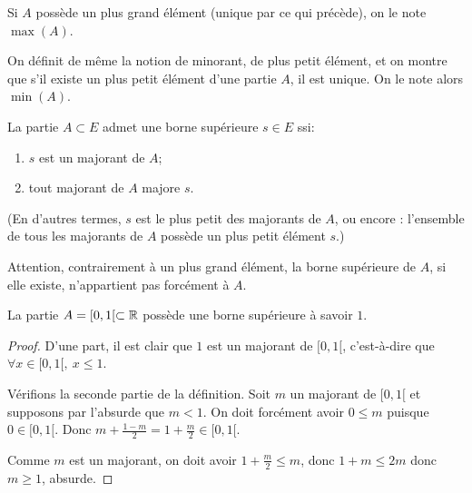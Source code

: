 Si $A$ possède un plus grand élément (unique par ce qui précède), on le note $\max(A)$.


On définit de même  la notion de minorant, de plus petit élément, et on montre que s'il existe un plus petit élément d'une partie $A$, il est unique. On le note alors $\min(A)$.

\begin{definition} La partie $A\subset E$ admet une borne supérieure $s\in E$ ssi:
\begin{enumerate}
\item $s$ est un majorant de $A$;
\item tout majorant de $A$ majore $s$.
\end{enumerate}
(En d'autres termes, $s$ est le plus petit des majorants de $A$, ou encore : l'ensemble de tous les majorants de $A$ possède un plus petit élément $s$.)
\end{definition}

Attention, contrairement à un plus grand élément, la borne supérieure de $A$, si elle existe, n'appartient pas forcément à $A$. 
\begin{exemple}
La partie $A=[0,1[ \subset \mathbb{R}$ possède une borne supérieure à savoir $1$.
\end{exemple}
\begin{proof}
D'une part, il est clair que $1$ est un majorant de $[0,1[$, c'est-à-dire que $\forall x\in [0,1[, \: x\leq 1$.

Vérifions la seconde partie de la définition.  Soit $m$ un majorant de $[0,1[$ et supposons par l'absurde que $m < 1$. On doit forcément avoir $0\leq m$ puisque $0\in [0,1[$. Donc $m+\frac{1-m}{2}=1+\frac{m}{2} \in [0,1[$.
\begin{center}
\end{center}

 Comme $m$ est un majorant, on doit avoir $1+\frac{m}{2}\leq m$, donc $1+m\leq 2m$ donc $m\geq 1$, absurde.
\end{proof}

